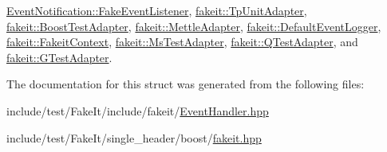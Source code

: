 \mbox{\hyperlink{classEventNotification_1_1FakeEventListener_a8d17ab08974befa7c652ef6a672f472a}{Event\+Notification\+::\+Fake\+Event\+Listener}}, \mbox{\hyperlink{classfakeit_1_1TpUnitAdapter_a9cdbf4f7a4a277d5b49740929fd8d2c7}{fakeit\+::\+Tp\+Unit\+Adapter}}, \mbox{\hyperlink{structfakeit_1_1BoostTestAdapter_a8c5e79f154223dce9fa9cbabd1bb3242}{fakeit\+::\+Boost\+Test\+Adapter}}, \mbox{\hyperlink{structfakeit_1_1MettleAdapter_a4abbacb12107084c5382975044282afe}{fakeit\+::\+Mettle\+Adapter}}, \mbox{\hyperlink{structfakeit_1_1DefaultEventLogger_a4bbb520dfe6bf042d7f0380e7b400bce}{fakeit\+::\+Default\+Event\+Logger}}, \mbox{\hyperlink{structfakeit_1_1FakeitContext_ac39067234f37a88f6c19440df0bc1b32}{fakeit\+::\+Fakeit\+Context}}, \mbox{\hyperlink{classfakeit_1_1MsTestAdapter_acee4f347e97ef8b0fa1ed66fe8b2841a}{fakeit\+::\+Ms\+Test\+Adapter}}, \mbox{\hyperlink{classfakeit_1_1QTestAdapter_a73e77ade8e08ed69ee1f510d21de4d4e}{fakeit\+::\+Q\+Test\+Adapter}}, and \mbox{\hyperlink{structfakeit_1_1GTestAdapter_a68bb18a833f63973f09d12597deb1cf7}{fakeit\+::\+G\+Test\+Adapter}}.



The documentation for this struct was generated from the following files\+:\begin{DoxyCompactItemize}
\item 
include/test/\+Fake\+It/include/fakeit/\mbox{\hyperlink{EventHandler_8hpp}{Event\+Handler.\+hpp}}\item 
include/test/\+Fake\+It/single\+\_\+header/boost/\mbox{\hyperlink{single__header_2boost_2fakeit_8hpp}{fakeit.\+hpp}}\end{DoxyCompactItemize}
